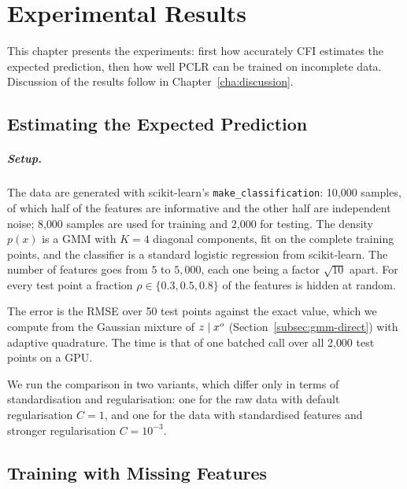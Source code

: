\renewcommand{\vec}[1]{\textbf{#1}}

\chapter{Experimental Results}
\label{cha:experimental_results}

This chapter presents the experiments: first how accurately CFI estimates the
expected prediction, then how well PCLR can be trained on incomplete data. Discussion of the results follow in
Chapter~\ref{cha:discussion}.

\section{Estimating the Expected Prediction}
\label{sec:results-estimate}

\paragraph{Setup.}
The data are generated with scikit-learn's \texttt{make\_classification}:
10{,}000 samples, of which half of the features are informative and the other
half are independent noise; 8{,}000 samples are used for training and 2{,}000 for
testing. The density $p(x)$ is a GMM with $K = 4$ diagonal components, fit on the
complete training points, and the classifier is a standard logistic regression from scikit-learn.
The number of features goes from $5$ to $5{,}000$, each one being
a factor $\sqrt{10}$ apart. For every test point a fraction
$\rho \in \{0.3, 0.5, 0.8\}$ of the features is hidden at random.

The error is the RMSE over 50 test
points against the exact value, which we compute from the Gaussian mixture of
$z \mid x^o$ (Section~\ref{subsec:gmm-direct}) with adaptive quadrature.
The time is that of one batched call over all 2{,}000 test points on a GPU.

We run the comparison in two variants, which differ only in terms of
standardisation and regularisation: one for the raw data with default regularisation $C = 1$, and one for the data with
standardised features and stronger regularisation $C = 10^{-3}$.


\clearpage

\section{Training with Missing Features}
\label{sec:training}

